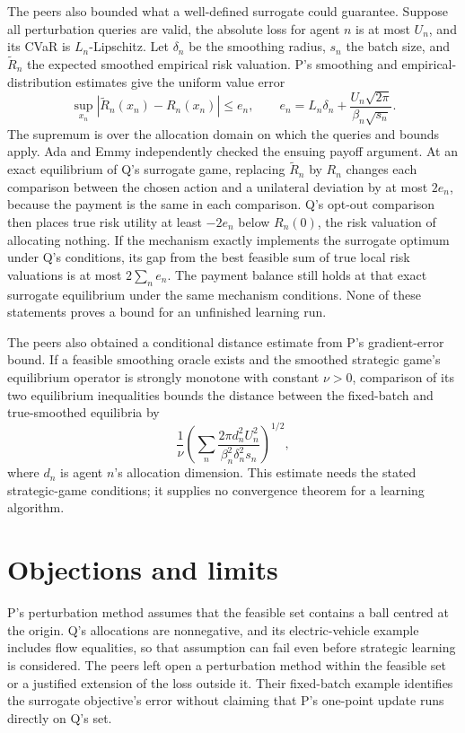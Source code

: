 \documentclass{article}
\begin{document}
The peers also bounded what a well-defined surrogate could guarantee. Suppose all perturbation queries are
valid, the absolute loss for agent \(n\) is at most \(U_n\), and its CVaR is \(L_n\)-Lipschitz. Let
\(\delta_n\) be the smoothing radius, \(s_n\) the batch size, and \(\widetilde R_n\) the expected smoothed
empirical risk valuation. P's smoothing and empirical-distribution estimates give the uniform value error
\[
\sup_{x_n}|\widetilde R_n(x_n)-R_n(x_n)|\leq e_n,
\qquad
e_n=L_n\delta_n+
\frac{U_n\sqrt{2\pi}}{\beta_n\sqrt{s_n}}.
\]
The supremum is over the allocation domain on which the queries and bounds apply. Ada and Emmy independently
checked the ensuing payoff argument. At an exact equilibrium of Q's surrogate game, replacing \(\widetilde
R_n\) by \(R_n\) changes each comparison between the chosen action and a unilateral deviation by at most
\(2e_n\), because the payment is the same in each comparison. Q's opt-out comparison then places true risk
utility at least \(-2e_n\) below \(R_n(0)\), the risk valuation of allocating nothing. If the mechanism
exactly implements the surrogate optimum under Q's conditions, its gap from the best feasible sum of true
local risk valuations is at most \(2\sum_n e_n\). The payment balance still holds at that exact surrogate
equilibrium under the same mechanism conditions. None of these statements proves a bound for an unfinished
learning run.

The peers also obtained a conditional distance estimate from P's gradient-error bound. If a feasible
smoothing oracle exists and the smoothed strategic game's equilibrium operator is strongly monotone with
constant \(\nu>0\), comparison of its two equilibrium inequalities bounds the distance between the
fixed-batch and true-smoothed equilibria by
\[
\frac{1}{\nu}\left(\sum_n
\frac{2\pi d_n^2U_n^2}{\beta_n^2\delta_n^2s_n}
\right)^{1/2},
\]
where \(d_n\) is agent \(n\)'s allocation dimension. This estimate needs the stated strategic-game
conditions; it supplies no convergence theorem for a learning algorithm.

\section{Objections and limits}

P's perturbation method assumes that the feasible set contains a ball centred at the origin. Q's allocations
are nonnegative, and its electric-vehicle example includes flow equalities, so that assumption can fail even
before strategic learning is considered. The peers left open a perturbation method within the feasible set
or a justified extension of the loss outside it. Their fixed-batch example identifies the surrogate
objective's error without claiming that P's one-point update runs directly on Q's set.
\end{document}

